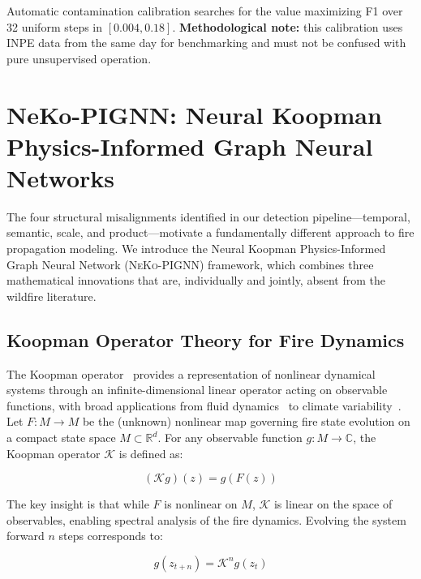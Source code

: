\documentclass[5p,twocolumn]{elsarticle}
\newcommand{\abbrev}[1]{{\small\textsc{#1}}}
\newcommand{\R}{\mathbb{R}}
\newcommand{\C}{\mathbb{C}}
\newcommand{\sK}{\mathcal{K}}
\begin{document}
Automatic contamination calibration searches for the value maximizing F1 over 32 uniform steps in $[0.004, 0.18]$. \textbf{Methodological note:} this calibration uses \abbrev{INPE} data from the same day for benchmarking and must not be confused with pure unsupervised operation.

\section{NeKo-PIGNN: Neural Koopman Physics-Informed Graph Neural Networks}
\label{sec:neko}

The four structural misalignments identified in our detection pipeline---temporal, semantic, scale, and product---motivate a fundamentally different approach to fire propagation modeling. We introduce the Neural Koopman Physics-Informed Graph Neural Network (\abbrev{NeKo-PIGNN}) framework, which combines three mathematical innovations that are, individually and jointly, absent from the wildfire literature.

\subsection{Koopman Operator Theory for Fire Dynamics}

The Koopman operator~\cite{koopman1931} provides a representation of nonlinear dynamical systems through an infinite-dimensional linear operator acting on observable functions, with broad applications from fluid dynamics~\cite{mezic2013,rowley2009} to climate variability~\cite{lorenzo2026}. Let $F: M \to M$ be the (unknown) nonlinear map governing fire state evolution on a compact state space $M \subset \R^d$. For any observable function $g: M \to \C$, the Koopman operator $\sK$ is defined as:

\begin{equation}
(\sK g)(z) = g(F(z))
\label{eq:koopman_def}
\end{equation}

The key insight is that while $F$ is nonlinear on $M$, $\sK$ is linear on the space of observables, enabling spectral analysis of the fire dynamics. Evolving the system forward $n$ steps corresponds to:

\begin{equation}
g(z_{t+n}) = \sK^n g(z_t)
\label{eq:koopman_iter}
\end{equation}
\end{document}
